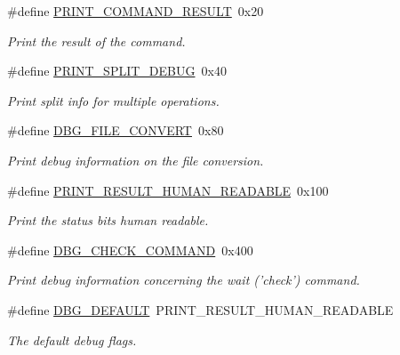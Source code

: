 \begin{CompactItemize}
\#define \hyperlink{group__dcsc__msg__buffer__access_g2f996fd7aaf5d3df34642fc4dcd9ef66}{PRINT\_\-COMMAND\_\-RESULT}~0x20
\begin{CompactList}\small\item\em Print the result of the command. \item\end{CompactList}\item 
\#define \hyperlink{group__dcsc__msg__buffer__access_g36c838823c9602c6a0f6efd1fe135b18}{PRINT\_\-SPLIT\_\-DEBUG}~0x40
\begin{CompactList}\small\item\em Print split info for multiple operations. \item\end{CompactList}\item 
\#define \hyperlink{group__dcsc__msg__buffer__access_g6fe994d64da543fe875682bb79b5d585}{DBG\_\-FILE\_\-CONVERT}~0x80
\begin{CompactList}\small\item\em Print debug information on the file conversion. \item\end{CompactList}\item 
\#define \hyperlink{group__dcsc__msg__buffer__access_g5d966eba98a480141a4145615ca3ea15}{PRINT\_\-RESULT\_\-HUMAN\_\-READABLE}~0x100
\begin{CompactList}\small\item\em Print the status bits human readable. \item\end{CompactList}\item 
\#define \hyperlink{group__dcsc__msg__buffer__access_g7eaf88fd984d7f7c8c760dce4cb355d1}{DBG\_\-CHECK\_\-COMMAND}~0x400
\begin{CompactList}\small\item\em Print debug information concerning the wait ('check') command. \item\end{CompactList}\item 
\#define \hyperlink{group__dcsc__msg__buffer__access_gf34c3c30400c83a97dd0deadaead479c}{DBG\_\-DEFAULT}~PRINT\_\-RESULT\_\-HUMAN\_\-READABLE
\begin{CompactList}\small\item\em The default debug flags. \item\end{CompactList}\end{CompactItemize}
